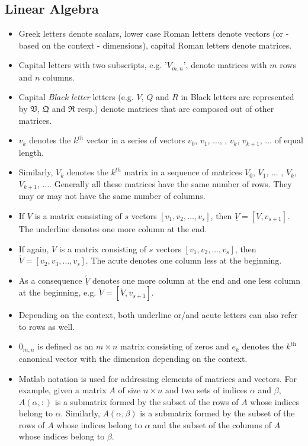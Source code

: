 \documentclass{scrartcl}
\numberwithin{equation}{section}
\begin{document}
\subsection*{Linear Algebra}
\begin{itemize}
\item Greek letters denote scalars, lower case Roman letters denote vectors (or - based on the context - dimensions), capital Roman letters denote matrices.
\item Capital letters with two subscripts, e.g. '$V_{m, n}$', denote matrices with $m$ rows and $n$ columns.
\item Capital \textit{Black letter} letters (e.g. $V$, $Q$ and $R$ in Black letters are represented by $\mathfrak{V}$, $\mathfrak{Q}$ and $\mathfrak{R}$ resp.) denote matrices that are composed out of other matrices. 
\item $v_k$ denotes the $k^{th}$ vector in a series of vectors $v_0$, $v_1$, $\ldots$, ,  $v_k$, $v_{k+1}$, $\ldots$ of equal length.
\item Similarly, $V_k$ denotes the $k^{th}$ matrix in a sequence of matrices $V_0$, $V_1$, $\ldots$ , $V_k$, $V_{k+1}$, $\ldots$. Generally all these matrices have the same number of rows. They may or may not have the same number of columns.
\item If $V$ is a matrix consisting of $s$ vectors $\left[v_1, v_2, \ldots, v_s\right]$, then $\underline{V} = \left[V, v_{s+1} \right]$. The underline denotes one more column at the end.
\item If again, $V$ is a matrix consisting of $s$ vectors $\left[v_1, v_2, \ldots, v_s\right]$, then $\acute{V} = [v_2, v_3, \ldots, v_s]$. The acute denotes one column less at the beginning.
\item As a consequence $\underline{\acute{V}}$ denotes one more column at the end and one less column at the beginning, e.g. $\underline{\acute{V}} = [\acute{V}, v_{s+1}]$.
\item Depending on the context, both underline or/and acute letters can also refer to rows as well. 
\item $0_{m, n}$ is defined as an $m \times n$ matrix consisting of zeros and $e_k$ denotes the $k^{\text{th}}$ canonical vector with the dimension depending on the context.
\item Matlab notation is used for addressing elements of matrices and vectors. For example, given a matrix $A$ of size $n \times n$ and two sets of indices $\alpha$ and $\beta$, $A(\alpha,:)$ is a submatrix formed by the subset of the rows of $A$ whose indices belong to $\alpha$. Similarly, $A(\alpha, \beta)$ is a submatrix formed by the subset of the rows of $A$ whose indices belong to $\alpha$ and the subset of the columns of $A$ whose indices belong to $\beta$.
\end{itemize}
\end{document}
